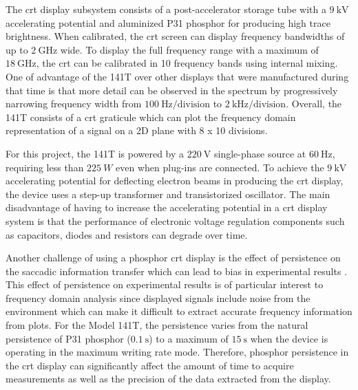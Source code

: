 \documentclass[class=report,11pt,crop=false]{standalone}
\begin{document}
The \acrshort{crt} display subsystem consists of a post-accelerator storage tube with a $\SI{9}{\kilo\volt}$ accelerating potential and aluminized P31 phosphor for producing high trace brightness. When calibrated, the \acrshort{crt} screen can display frequency bandwidths of up to $\SI{2}{\giga\hertz}$ wide. To display the full frequency range with a maximum of $\SI{18}{\giga\hertz}$, the \acrshort{crt} can be calibrated in 10 frequency bands using internal mixing. One of advantage of the 141T over other displays that were manufactured during that time is that more detail can be observed in the spectrum by progressively narrowing frequency width from $\SI{100}{\hertz}/\text{division}$ to $\SI{2}{\kilo\hertz}/\text{division}$. Overall, the 141T consists of a \acrshort{crt} graticule which can plot the frequency domain representation of a signal on a 2D plane with 8 x 10 divisions. 

For this project, the 141T is powered by a $\SI{220}{\volt}$ single-phase source at $\SI{60}{\hertz}$, requiring less than $\SI{225}{W}$ even when plug-ins are connected. To achieve the $\SI{9}{\kilo\volt}$ accelerating potential for deflecting electron beams in producing the \acrshort{crt} display, the device uses a step-up transformer and transistorized oscillator. The main disadvantage of having to increase the accelerating potential in a \acrshort{crt} display system is that the performance of electronic voltage regulation components such as capacitors, diodes and resistors can degrade over time. 

Another challenge of using a phosphor \acrshort{crt} display is the effect of persistence on the saccadic information transfer which can lead to bias in experimental results \cite{wolf1997}. This effect of persistence on experimental results is of particular interest to frequency domain analysis since displayed signals include noise from the environment which can make it difficult to extract accurate frequency information from plots. For the Model 141T, the persistence varies from the natural persistence of P31 phosphor ($\SI{0.1}{\second}$) to a maximum of $\SI{15}{\second}$ when the device is operating in the maximum writing rate mode. Therefore, phosphor persistence in the \acrshort{crt} display can significantly affect the amount of time to acquire measurements as well as the precision of the data extracted from the display.
\end{document}
